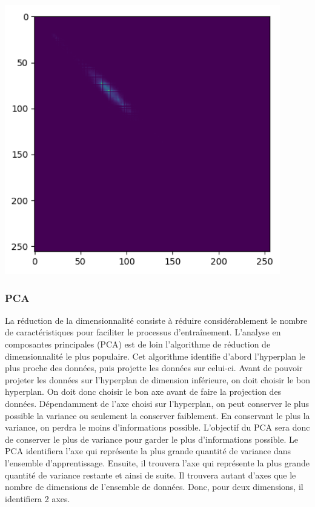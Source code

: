 \documentclass[12pt,twoside,letterpaper]{article}
\begin{document}
\begin{center}
    \includegraphics[width = 12cm]{glcm}
\end{center}


\subsubsection{PCA}
La réduction de la dimensionnalité consiste à réduire considérablement le nombre de caractéristiques pour faciliter le processus d’entraînement. L'analyse en composantes principales (PCA) est de loin l'algorithme de réduction de dimensionnalité le plus populaire. Cet algorithme identifie d'abord l'hyperplan le plus proche des données, puis projette les données sur celui-ci. Avant de pouvoir projeter les données sur l’hyperplan de dimension inférieure, on doit choisir le bon hyperplan. On doit donc choisir le bon axe avant de faire la projection des données. Dépendamment de l’axe choisi sur l’hyperplan, on peut conserver le plus possible la variance ou seulement la conserver faiblement. En conservant le plus la variance, on perdra le moins d’informations possible. L’objectif du PCA sera donc de conserver le plus de variance pour garder le plus d’informations possible. Le PCA identifiera l’axe qui représente la plus grande quantité de variance dans l'ensemble d'apprentissage. Ensuite, il trouvera l’axe qui représente la plus grande quantité de variance restante et ainsi de suite. Il trouvera autant d’axes que le nombre de dimensions de l’ensemble de données. Donc, pour deux dimensions, il identifiera 2 axes.
\citep{ref_03}
\end{document}
